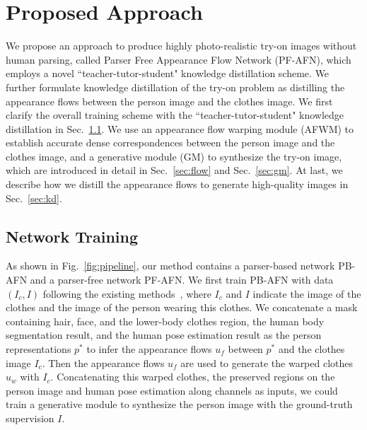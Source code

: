 \documentclass[final]{cvpr}
\begin{document}
	
\section{Proposed Approach}
We propose an approach to produce highly photo-realistic try-on images without human parsing, called Parser Free Appearance Flow Network (PF-AFN), which employs a novel ``teacher-tutor-student" knowledge distillation scheme.
We further formulate knowledge distillation of the try-on problem as distilling the appearance flows between the person image and the clothes image.
We first clarify the overall training scheme with the ``teacher-tutor-student" knowledge distillation in Sec.~\ref{sec:pipeline}. 
We use an appearance flow warping module (AFWM) to establish accurate dense correspondences between the person image and the clothes image, and a generative module (GM) to synthesize the try-on image, which are introduced in detail in Sec.~\ref{sec:flow} and Sec.~\ref{sec:gm}.
At last, we describe how we distill the appearance flows to generate high-quality images in Sec.~\ref{sec:kd}.
	
	
	\subsection{Network Training} \label{sec:pipeline}
	As shown in Fig.~\ref{fig:pipeline}, our method contains a parser-based network PB-AFN and a parser-free network PF-AFN.
We first train PB-AFN with data $( I_c, I)$  following the existing methods~\cite{cpvton,clothflow,ACGPN}, where $I_c$ and $I$ indicate the image of the clothes and the image of the person wearing this clothes. 
We concatenate a mask containing hair, face, and the lower-body clothes region, the human body segmentation result, and the human pose estimation result as the person representations $p^*$ to infer the appearance flows ${u}_f$ between $p^*$ and the clothes image $I_c$.
Then the appearance flows ${u}_f$ are used to generate the warped clothes ${u}_w$ with $I_c$.
Concatenating this warped clothes, the preserved regions on the person image and human pose estimation along channels as inputs, we could train a generative module to synthesize the person image with the ground-truth supervision $I$.
	
\end{document}

